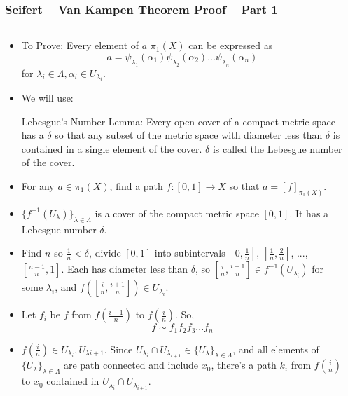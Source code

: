 \documentclass[8pt]{beamer}
\begin{document}
  \begin{frame}
    \frametitle{Seifert -- Van Kampen Theorem Proof -- Part 1}
    \begin{columns}
      \begin{column}[T]{0.5\textwidth}
        \begin{itemize}
          \item<1-> To Prove: Every element of $a$ $\pi_1(X)$ can be expressed as
            \[a = \psi_{\lambda_1}(\alpha_1)\psi_{\lambda_2}(\alpha_2) ...
              \psi_{\lambda_n}(\alpha_n)\]
            for $\lambda_i \in \Lambda, \alpha_i \in U_{\lambda_i}$.
          \item<2-> We will use:

            Lebesgue's Number Lemma: Every open cover of a compact metric space
            has a $\delta$ so that any subset of the metric space with diameter
            less than $\delta$ is contained in a single element of the cover.
            $\delta$ is called the Lebesgue number of the cover.
          \item<3-> For any $a \in \pi_1(X)$, find a path $f : [0,1] \rightarrow X$
            so that $a = [f]_{\pi_1(X)}$.
          \item<4-> $\{f^{-1}(U_\lambda)\}_{\lambda
            \in \Lambda}$ is a cover of the compact metric space $[0,1]$. It
            has a Lebesgue number $\delta$.
          \item<5-> Find $n$ so $\frac{1}{n} < \delta$, divide $[0,1]$ into
            subintervals $[0,\frac{1}{n}]$, $[\frac{1}{n}, \frac{2}{n}]$, ...,
            $[\frac{n-1}{n},1]$. Each has diameter less than $\delta$, so
            $[\frac{i}{n}, \frac{i+1}{n}] \in f^{-1}(U_{\lambda_i})$ for some
            $\lambda_i$, and $f([\frac{i}{n}, \frac{i+1}{n}]) \in U_{\lambda_i}$.
          \item<6-> Let $f_i$ be $f$ from $f(\frac{i-1}{n})$ to $f(\frac{i}{n})$. So,
              \[f \sim f_1 f_2 f_3 ... f_n\]
          \item<7-> $f(\frac{i}{n}) \in U_{\lambda_i}, U_{\lambda{i+1}}$. Since
            $U_{\lambda_i} \cap U_{\lambda_{i+1}} \in \{U_\lambda\}_{\lambda
            \in \Lambda}$, and all elements of $\{U_\lambda\}_{\lambda \in
            \Lambda}$ are path connected and include $x_0$, there's a path $k_i$
            from $f(\frac{i}{n})$ to $x_0$ contained in $U_{\lambda_i} \cap
            U_{\lambda_{i+1}}$.

        \end{itemize}
      \end{column}
      \begin{column}[T]{0.5\textwidth}


\end{column}
\end{columns}
\end{frame}
\end{document}
